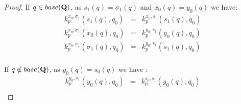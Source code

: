 \begin{proof}
	If $q \in base(\mathbf{Q})$, as $s_1(q) = \sigma_1(q)$ and $x_0(q) = y_0(q)$ we have:
	\begin{eqnarray*}
		k^{x_0,\sigma_1}_p(s_1(q),q_0) & =  &k^{x_0,s_1}_p(s_1(q),q_0) \\
		k^{x_0,\sigma_1}_p(x_0(q),q_0) &= & k^{y_0,s_1}_p(y_0(q),q_0) \\
		k^{x_0,\sigma_1}_p(\sigma_1(q),q_0) &= &k^{y_0,s_1}_p(s_1(q),q_0) \\
	\end{eqnarray*}
	
	If $q \notin base(\mathbf{Q})$, as $y_0(q) = s_0(q)$ we have :
	\begin{eqnarray*}
		k^{y_0,s_1}_p(y_0(q),q_0) &= & k^{s_0,s_1}_p(y_0(q),q_0) \\
	\end{eqnarray*}
	

\end{proof}
